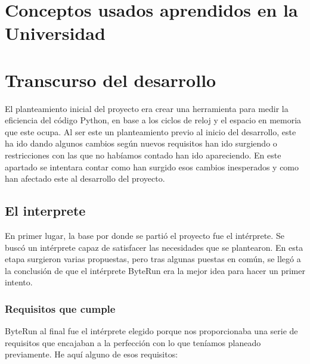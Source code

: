 


\section{Conceptos usados aprendidos en la Universidad}


\section{Transcurso del desarrollo}

El planteamiento inicial del proyecto era crear una herramienta para medir la eficiencia del código Python, en base a los ciclos de reloj y el espacio en memoria que este ocupa. Al ser este un planteamiento previo al inicio del desarrollo, este ha ido dando algunos cambios según nuevos requisitos han ido surgiendo o restricciones con las que no habíamos contado han ido apareciendo. En este apartado se intentara contar como han surgido esos cambios inesperados y como han afectado este al desarrollo del proyecto.\\

\subsection{El interprete}

En primer lugar, la base por donde se partió el proyecto fue el intérprete. Se buscó un intérprete capaz de satisfacer las necesidades que se plantearon. En esta etapa surgieron varias propuestas, pero tras algunas puestas en común, se llegó a la conclusión de que el intérprete ByteRun era la mejor idea para hacer un primer intento.\\

\subsubsection{Requisitos que cumple}
ByteRun al final fue el intérprete elegido porque nos proporcionaba una serie de requisitos que encajaban a la perfección con lo que teníamos planeado previamente. He aquí alguno de esos requisitos:\\

